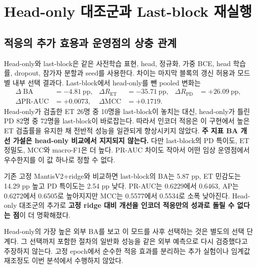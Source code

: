\documentclass[11pt,a4paper]{article}
\DeclareMathOperator{\BA}{BA}
\begin{document}
\section{Head-only 대조군과 Last-block 재실행}\label{sec:ablation}
\subsection{적응의 추가 효용과 운영점의 상충 관계}
Head-only와 last-block은 같은 사전학습 표현, head, 정규화, 가중 BCE,
head 학습률, dropout, 참가자 분할과 seed를 사용한다.
차이는 마지막 블록의 갱신 허용과 모드별 내부 선택 결과다.
Last-block에서 head-only를 뺀 pooled 변화는
\begin{align}
 \Delta\BA&=-4.81\ \mathrm{pp},&
 \Delta R_{\mathrm{ET}}&=-35.71\ \mathrm{pp},&
 \Delta R_{\mathrm{PD}}&=+26.09\ \mathrm{pp},\\
 \Delta\mathrm{PR}\text{-}\mathrm{AUC}&=+0.0073,&
 \Delta\mathrm{MCC}&=+0.1719.
\end{align}
Head-only가 검출한 ET 26명 중 10명을 last-block이 놓치는 대신,
head-only가 틀린 PD 82명 중 72명을 last-block이 바로잡는다.
따라서 인코더 적응은 이 구현에서 높은 ET 검출률을 유지한 채 전반적 성능을
일관되게 향상시키지 않았다. \textbf{주 지표 BA 개선 가설은 head-only 비교에서 지지되지 않는다.}
다만 last-block의 PD 특이도, ET 정밀도, MCC와 macro-F1은 더 높다.
PR-AUC 차이도 작아서 어떤 임상 운영점에서 우수한지를 이 값 하나로 정할 수 없다.

기존 고정 MantisV2+ridge와 비교하면 last-block의 BA는 5.87 pp,
ET 민감도는 14.29 pp 높고 PD 특이도는 2.54 pp 낮다.
PR-AUC는 0.6229에서 0.6463, AP는 0.6272에서 0.6505로 높아지지만
MCC는 0.5577에서 0.5534로 소폭 낮아진다.
Head-only 대조군의 추가로 \textbf{고정 ridge 대비 개선을 인코더 적응만의 성과로
돌릴 수 없다는 점}이 더 명확해졌다.

Head-only의 가장 높은 외부 BA를 보고 이 모드를 사후 선택하는 것은 별도의 선택 단계다.
그 선택까지 포함한 절차의 일반화 성능을 같은 외부 예측으로 다시 검증했다고 주장하지 않는다.
고정 epoch에서 순수한 적응 효과를 분리하는 추가 실험이나 임계값 재조정도 이번 분석에서 수행하지 않았다.
\end{document}
